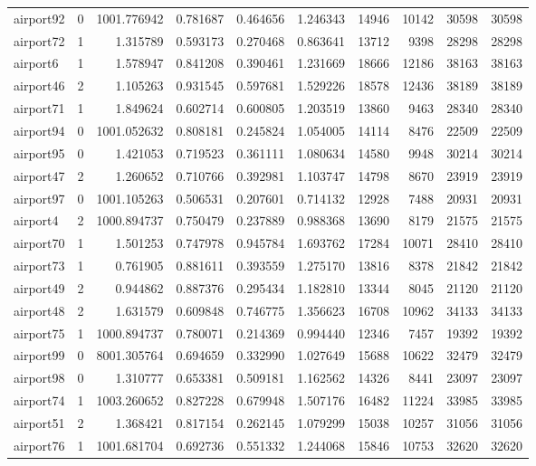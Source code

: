 \begin{longtable}{|l|r|r|r|r|r|r|r|r|r|}
airport92 & 0 & 1001.776942 & 0.781687 & 0.464656 & 1.246343 & 14946 & 10142 & 30598 & 30598 \\
airport72 & 1 & 1.315789 & 0.593173 & 0.270468 & 0.863641 & 13712 & 9398 & 28298 & 28298 \\
airport6 & 1 & 1.578947 & 0.841208 & 0.390461 & 1.231669 & 18666 & 12186 & 38163 & 38163 \\
airport46 & 2 & 1.105263 & 0.931545 & 0.597681 & 1.529226 & 18578 & 12436 & 38189 & 38189 \\
airport71 & 1 & 1.849624 & 0.602714 & 0.600805 & 1.203519 & 13860 & 9463 & 28340 & 28340 \\
airport94 & 0 & 1001.052632 & 0.808181 & 0.245824 & 1.054005 & 14114 & 8476 & 22509 & 22509 \\
airport95 & 0 & 1.421053 & 0.719523 & 0.361111 & 1.080634 & 14580 & 9948 & 30214 & 30214 \\
airport47 & 2 & 1.260652 & 0.710766 & 0.392981 & 1.103747 & 14798 & 8670 & 23919 & 23919 \\
airport97 & 0 & 1001.105263 & 0.506531 & 0.207601 & 0.714132 & 12928 & 7488 & 20931 & 20931 \\
airport4 & 2 & 1000.894737 & 0.750479 & 0.237889 & 0.988368 & 13690 & 8179 & 21575 & 21575 \\
airport70 & 1 & 1.501253 & 0.747978 & 0.945784 & 1.693762 & 17284 & 10071 & 28410 & 28410 \\
airport73 & 1 & 0.761905 & 0.881611 & 0.393559 & 1.275170 & 13816 & 8378 & 21842 & 21842 \\
airport49 & 2 & 0.944862 & 0.887376 & 0.295434 & 1.182810 & 13344 & 8045 & 21120 & 21120 \\
airport48 & 2 & 1.631579 & 0.609848 & 0.746775 & 1.356623 & 16708 & 10962 & 34133 & 34133 \\
airport75 & 1 & 1000.894737 & 0.780071 & 0.214369 & 0.994440 & 12346 & 7457 & 19392 & 19392 \\
airport99 & 0 & 8001.305764 & 0.694659 & 0.332990 & 1.027649 & 15688 & 10622 & 32479 & 32479 \\
airport98 & 0 & 1.310777 & 0.653381 & 0.509181 & 1.162562 & 14326 & 8441 & 23097 & 23097 \\
airport74 & 1 & 1003.260652 & 0.827228 & 0.679948 & 1.507176 & 16482 & 11224 & 33985 & 33985 \\
airport51 & 2 & 1.368421 & 0.817154 & 0.262145 & 1.079299 & 15038 & 10257 & 31056 & 31056 \\
airport76 & 1 & 1001.681704 & 0.692736 & 0.551332 & 1.244068 & 15846 & 10753 & 32620 & 32620 \\

\end{longtable}
